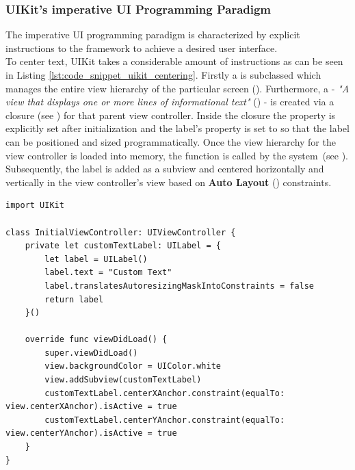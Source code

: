 \subsubsection{UIKit's imperative UI Programming Paradigm}
The imperative UI programming paradigm is characterized by explicit instructions to the framework to achieve a desired user interface.\\
To center text, UIKit takes a considerable amount of instructions as can be seen in Listing \ref{lst:code_snippet_uikit_centering}.
Firstly a  is subclassed which manages the entire view hierarchy of the particular screen (\cite{UIViewControllerDocumentation2021}). 
Furthermore, a  - \textit{"A view that displays one or more lines of informational text"} (\cite[l.1]{UILabelDocumentation2021}) - is created via a closure (see \cite{ClosureDocumentation2021}) for that parent view controller.
Inside the closure the  property is explicitly set after initialization and the label's  property is set to  so that the label can be positioned and sized programmatically.
Once the view hierarchy for the view controller is loaded into memory, the  function is called by the system (see \cite{viewDidLoadDocumentation2021}).
Subsequently, the label is added as a subview and centered horizontally and vertically in the view controller's view based on \textbf{Auto Layout} (\cite{AutoLayoutDocumentation2016}) constraints.\\

\begin{minipage}{\linewidth}
    \begin{lstlisting}[caption={iOS UIKit Example of Centering Text on a Screen},label={lst:code_snippet_uikit_centering}]
import UIKit

class InitialViewController: UIViewController {
    private let customTextLabel: UILabel = {
        let label = UILabel()
        label.text = "Custom Text"
        label.translatesAutoresizingMaskIntoConstraints = false
        return label
    }()

    override func viewDidLoad() {
        super.viewDidLoad()
        view.backgroundColor = UIColor.white
        view.addSubview(customTextLabel)
        customTextLabel.centerXAnchor.constraint(equalTo: view.centerXAnchor).isActive = true
        customTextLabel.centerYAnchor.constraint(equalTo: view.centerYAnchor).isActive = true
    }
}
    \end{lstlisting}
\end{minipage}

